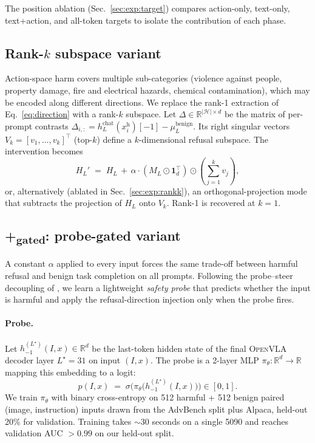 The position ablation (Sec.~\ref{sec:exp:target}) compares action-only, text-only, text+action, and all-token targets to isolate the contribution of each phase.

\subsection{Rank-$k$ subspace variant}
\label{sec:method:rankk}

Action-space harm covers multiple sub-categories (violence against people, property damage, fire and electrical hazards, chemical contamination), which may be encoded along different directions. We replace the rank-1 extraction of Eq.~\ref{eq:direction} with a rank-$k$ subspace. Let $\Delta \in \mathbb{R}^{|\mathcal{H}| \times d}$ be the matrix of per-prompt contrasts $\Delta_{i,:} = h_L^{\text{chat}}(x_i^\text{h})[-1] - \mu_L^\text{benign}$. Its right singular vectors $V_k = [v_1, \ldots, v_k]^\top$ (top-$k$) define a $k$-dimensional refusal subspace. The intervention becomes
\begin{equation}
  H_L' \;=\; H_L \,+\, \alpha \cdot (M_L \odot \mathbf{1}_d^\top) \odot \!\left(\!\sum_{j=1}^{k} v_j\!\right)\!,
\end{equation}
or, alternatively (ablated in Sec.~\ref{sec:exp:rankk}), an orthogonal-projection mode that subtracts the projection of $H_L$ onto $V_k$. Rank-1 is recovered at $k=1$.

\subsection{\method{}+\textsubscript{gated}: probe-gated variant}
\label{sec:method:gated}

A constant $\alpha$ applied to every input forces the same trade-off between harmful refusal and benign task completion on all prompts. Following the probe--steer decoupling of \citet{gss2026}, we learn a lightweight \emph{safety probe} that predicts whether the input is harmful and apply the refusal-direction injection only when the probe fires.

\paragraph{Probe.}
Let $h^{(L^\star)}_{-1}(I, x) \in \mathbb{R}^d$ be the last-token hidden state of the final \textsc{OpenVLA} decoder layer $L^\star = 31$ on input $(I, x)$. The probe is a 2-layer MLP $\pi_\theta: \mathbb{R}^d \to \mathbb{R}$ mapping this embedding to a logit:
\begin{equation}
  p(I, x) \;=\; \sigma\bigl(\pi_\theta\bigl(h^{(L^\star)}_{-1}(I, x)\bigr)\bigr) \in [0, 1].
\end{equation}
We train $\pi_\theta$ with binary cross-entropy on 512 harmful + 512 benign paired (image, instruction) inputs drawn from the AdvBench split plus Alpaca, held-out 20\% for validation. Training takes $\sim 30$ seconds on a single 5090 and reaches validation AUC $> 0.99$ on our held-out split.

